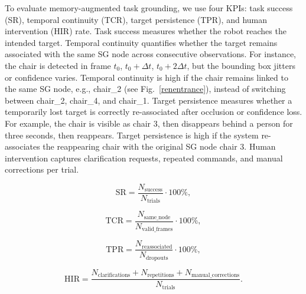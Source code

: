 \documentclass[lettersize,journal]{IEEEtran}
\begin{document}
To evaluate memory-augmented task grounding, we use four KPIs: task success (SR), temporal continuity (TCR), target persistence (TPR), and human intervention (HIR) rate. Task success measures whether the robot reaches the intended target. Temporal continuity quantifies whether the target remains associated with the same SG node across consecutive observations. For instance, the chair is detected in frame $t_0$, $t_0+\Delta t$, $t_0+2\Delta t$, but the bounding box jitters or confidence varies. Temporal continuity is high if the chair remains linked to the same SG node, e.g., chair\_2 (see Fig.~\ref{renentrance}), instead of switching between chair\_2, chair\_4, and chair\_1. Target persistence measures whether a temporarily lost target is correctly re-associated after occlusion or confidence loss. For example, the chair is visible as chair 3, then disappears behind a person for three seconds, then reappears. Target persistence is high if the system re-associates the reappearing chair with the original SG node chair 3. Human intervention captures clarification requests, repeated commands, and manual corrections per trial.

\begin{equation}
	\mathrm{SR} =
	\frac{N_{\mathrm{success}}}{N_{\mathrm{trials}}}
	\cdot 100\% ,
	\label{eq:success_rate}
\end{equation}

\begin{equation}
	\mathrm{TCR} =
	\frac{N_{\mathrm{same\_node}}}{N_{\mathrm{valid\_frames}}}
	\cdot 100\% ,
	\label{eq:temporal_continuity_rate}
\end{equation}

\begin{equation}
	\mathrm{TPR} =
	\frac{N_{\mathrm{reassociated}}}{N_{\mathrm{dropouts}}}
	\cdot 100\% ,
	\label{eq:target_persistence_rate}
\end{equation}

\begin{equation}
	\mathrm{HIR} =
	\frac{N_{\mathrm{clarifications}} + N_{\mathrm{repetitions}} + N_{\mathrm{manual\_corrections}}}
	{N_{\mathrm{trials}}}.
	\label{eq:human_intervention_rate}
\end{equation}
\end{document}
